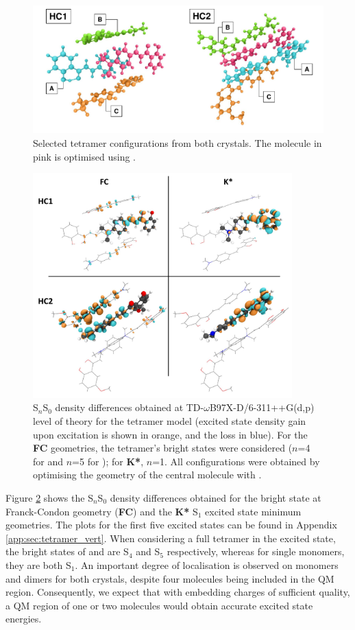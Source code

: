 \begin{figure}
\centering
\includegraphics[width=12cm]{Chapters/5Ewald/quad.pdf}
\caption{Selected tetramer configurations from both crystals. The molecule in pink is optimised using \EEC{}.}
\label{fig:quad}
\end{figure}

\begin{figure}
\centering
\includegraphics[width=10cm]{Chapters/5Ewald/quad_density.pdf}
\caption{S$_n$\textendash{}S$_0$ density differences obtained at TD-$\omega$B97X-D\slash{}6-311++G(d,p) level of theory for the tetramer model (excited state density gain upon excitation is shown in orange, and the loss in blue). For the \textbf{FC} geometries, the tetramer's bright states were considered ($n$=4 for \HC{} and $n$=5 for \HCC{}); for \textbf{K*}, $n$=1. All configurations were obtained by optimising the geometry of the central molecule with \EEC{}.}
\label{fig:dens}
\end{figure}


Figure \ref{fig:dens} shows the S$_n$\textendash{}S$_0$ density differences obtained for the bright state at Franck-Condon geometry (\textbf{FC}) and the \textbf{K*} S$_1$ excited state minimum geometries. The plots for the first five excited states can be found in Appendix \ref{app:sec:tetramer_vert}. When considering a full tetramer in the excited state, the bright states of \HC{} and \HCC{} are S$_4$ and S$_5$ respectively, whereas for single monomers, they are both S$_1$. An important degree of localisation is observed on monomers and dimers for both crystals, despite four molecules being included in the QM region. Consequently, we expect that with embedding charges of sufficient quality, a QM region of one or two molecules would obtain accurate excited state energies. 
  



